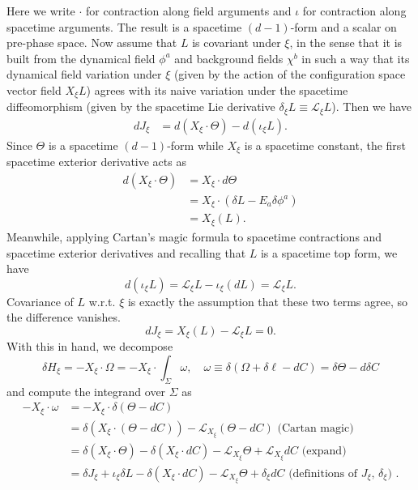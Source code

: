 \documentclass[11pt,letterpaper]{article}
\newcommand{\LP}{\left(}
\newcommand{\RP}{\right)}
\newcommand{\mc}[1]{\mathcal{#1}}
\begin{document}
Here we write $\cdot$ for contraction along field arguments and $\iota$ for contraction along spacetime arguments. The result is a spacetime $(d-1)$-form and a scalar on pre-phase space. Now assume that $L$ is covariant under $\xi$, in the sense that it is built from the dynamical field $\phi^a$ and background fields $\chi^b$ in such a way that its dynamical field variation under $\xi$ (given by the action of the configuration space vector field $X_\xi L$) agrees with its naive variation under the spacetime diffeomorphism (given by the spacetime Lie derivative $\delta_\xi L \equiv \mc{L}_\xi L$). Then we have \begin{equation}
\begin{aligned}
d J_\xi & = d \LP X_\xi \cdot \Theta \RP - d \LP \iota_\xi L \RP.
\end{aligned}
\end{equation}
Since $\Theta$ is a spacetime $(d-1)$-form while $X_\xi$ is a spacetime constant, the first spacetime exterior derivative acts as \begin{equation}
\begin{aligned}
d(X_\xi \cdot \Theta) & = X_\xi \cdot d \Theta \\
& = X_\xi \cdot (\delta L - E_a \delta \phi^a ) \\
& = X_\xi (L).
\end{aligned}
\end{equation}
Meanwhile, applying Cartan's magic formula to spacetime contractions and spacetime exterior derivatives and recalling that $L$ is a spacetime top form, we have \begin{equation}
d (\iota_\xi L) = \mc{L}_\xi L - \iota_\xi (dL) = \mc{L}_\xi L.
\end{equation}
Covariance of $L$ w.r.t. $\xi$ is exactly the assumption that these two terms agree, so the difference vanishes. \begin{equation}
d J_\xi = X_\xi (L) - \mc{L}_\xi L = 0.
\end{equation}
With this in hand, we decompose \begin{equation}
\delta H_\xi = - X_\xi \cdot \Omega = - X_\xi \cdot \int_\Sigma \omega, \quad \omega \equiv \delta (\Omega + \delta \ell - d C) = \delta \Theta - d \delta C
\end{equation}
and compute the integrand over $\Sigma$ as \begin{equation}
\begin{aligned}
- X_\xi \cdot \omega & = - X_\xi \cdot \delta (\Theta - dC) \\
& = \delta (X_\xi \cdot (\Theta - dC)) - \mc{L}_{X_\xi} (\Theta - dC) \mbox{ (Cartan magic)} \\
& = \delta (X_\xi \cdot \Theta) - \delta (X_\xi \cdot dC) - \mc{L}_{X_\xi} \Theta + \mc{L}_{X_\xi} d C \mbox{ (expand)} \\
& = \delta J_\xi + \iota_\xi \delta L - \delta (X_\xi \cdot dC) - \mc{L}_{X_\xi} \Theta + \delta_\xi d C \mbox{ (definitions of $J_\xi$, $\delta_\xi$) }.
\end{aligned}
\end{equation}
\end{document}
